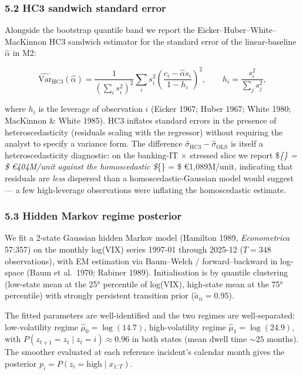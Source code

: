\documentclass[
]{article}
\begin{document}
\subsubsection{5.2 HC3 sandwich standard
error}\label{hc3-sandwich-standard-error}

Alongside the bootstrap quantile band we report the
Eicker--Huber--White--MacKinnon HC3 sandwich estimator for the standard
error of the linear-baseline \(\hat{\alpha}\) in M2:

\[
\widehat{\text{Var}}_{\text{HC3}}(\hat{\alpha}) = \frac{1}{(\sum_i s_i^2)^2} \sum_i s_i^2 \left( \frac{c_i - \hat{\alpha} s_i}{1 - h_i} \right)^2, \qquad h_i = \frac{s_i^2}{\sum_j s_j^2},
\]

where \(h_i\) is the leverage of observation \(i\) (Eicker 1967; Huber
1967; White 1980; MacKinnon \& White 1985). HC3 inflates standard errors
in the presence of heteroscedasticity (residuals scaling with the
regressor) without requiring the analyst to specify a variance form. The
difference \(\hat{\sigma}_{\text{HC3}} - \hat{\sigma}_{\text{OLS}}\) is
itself a heteroscedasticity diagnostic: on the banking-IT × stressed
slice we report \$\hat{\sigma}\emph{\{\} = \$ €404M/unit
against the homoscedastic \$\hat{\sigma}}\{\} = \$
€1,089M/unit, indicating that residuals are \emph{less} dispersed than a
homoscedastic-Gaussian model would suggest --- a few high-leverage
observations were inflating the homoscedastic estimate.

\subsubsection{5.3 Hidden Markov regime
posterior}\label{hidden-markov-regime-posterior}

We fit a 2-state Gaussian hidden Markov model (Hamilton 1989,
\emph{Econometrica} 57:357) on the monthly log(VIX) series 1997-01
through 2025-12 (\(T = 348\) observations), with EM estimation via
Baum--Welch / forward--backward in log-space (Baum et al.~1970; Rabiner
1989). Initialisation is by quantile clustering (low-state mean at the
25° percentile of log(VIX), high-state mean at the 75° percentile) with
strongly persistent transition prior (\(\tilde{a}_{ii} = 0.95\)).

The fitted parameters are well-identified and the two regimes are
well-separated: low-volatility regime \(\hat{\mu}_0 = \log(14.7)\),
high-volatility regime \(\hat{\mu}_1 = \log(24.9)\), with
\(P(z_{t+1} = z_t \mid z_t = i) \approx 0.96\) in both states (mean
dwell time \(\sim 25\) months). The smoother evaluated at each reference
incident's calendar month gives the posterior
\(p_i = P(z_i = \text{high} \mid x_{1:T})\).
\end{document}
